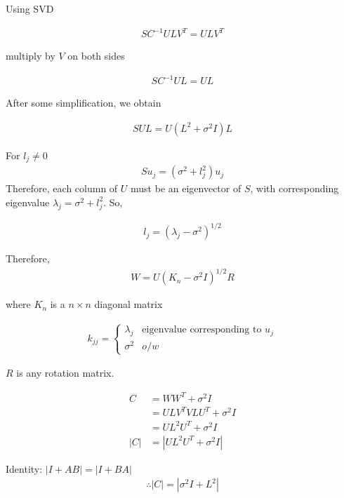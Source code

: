 \documentclass[10pt,onecolumn,letterpaper]{article}
\begin{document}
Using SVD
    
\begin{align}
    SC^{-1}ULV^T = ULV^T
\end{align}

multiply by $V$ on both sides

\begin{align}
    SC^{-1}UL = UL
\end{align}

After some simplification, we obtain

\begin{align}
    SUL = U\left(L^2+\sigma^2I\right)L
\end{align}
    
For $l_j \neq 0$
\begin{align}
Su_j = \left(\sigma^2+l_j^2\right)u_j
\end{align}
Therefore, each column of $U$ must be an eigenvector of $S$, with corresponding eigenvalue $\lambda_j = \sigma^2+l_j^2$. So,

\begin{align}
l_j = (\lambda_j-\sigma^2)^{1/2} \tag{5}
\end{align}



Therefore,
\begin{align}
W = U\left(K_n-\sigma^2I\right)^{1/2}R
\end{align}

where $K_n$ is a $n\times n$ diagonal matrix

\begin{align}
k_{jj} = \begin{cases}\lambda_j & \text{eigenvalue corresponding to }u_j\\
\sigma^2 & o/w\end{cases}
\end{align}

$R$ is any rotation matrix.

\begin{align}
C &= WW^T+\sigma^2I\\
&= ULV^TVLU^T+\sigma^2I\\
&= UL^2U^T+\sigma^2I\\
|C| &= |UL^2U^T+\sigma^2I|
\end{align}

Identity: $|I+AB| = |I+BA|$
\begin{align}
    \therefore |C| = |\sigma^2I+L^2| \label{eq:det_C}
\end{align}
\end{document}
